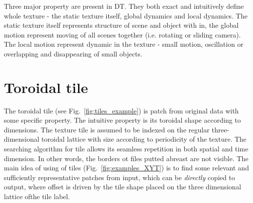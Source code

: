 

		
		Three major property\cite{doretto02thesis} are present in DT. They both exact and intuitively define whole texture - the static texture itself, global dynamics and local dynamics. The static texture itself represents structure of scene and object with in, the global motion represent moving of all scenes together (i.e. rotating or sliding camera). The local motion represent dynamic in the texture - small motion, oscillation or overlapping and disappearing of small objects.
		


		\section {Toroidal tile}
		

	The toroidal tile (see Fig.~\ref{fig:tiles_example}) is patch from original data with some specific property. The intuitive property is its toroidal shape according to dimensions. The texture tile is assumed to be indexed on the regular three-dimensional toroidal lattice with size according to periodicity of the texture. The searching algorithm for tile allows its seamless repetition in both spatial and time dimension. In other words, the borders ot files putted abreast are not visible. The main idea of using of tiles (Fig.~\ref{fig:examples_XYT}) is to find some relevant and sufficiently representative patches from input, which can be \emph{directly} copied to output, where offset is driven by the tile shape placed on the three dimensional lattice ofthe  tile label. 
	
